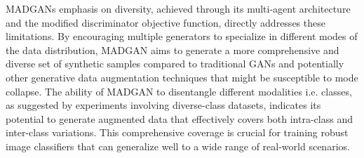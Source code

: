 MADGANs \cite{ghosh2018madgan} emphasis on diversity, achieved through its multi-agent architecture and the modified discriminator objective function, directly addresses these limitations. By encouraging multiple generators to specialize in different modes of the data distribution, MADGAN aims to generate a more comprehensive and diverse set of synthetic samples compared to traditional GANs and potentially other generative data augmentation techniques that might be susceptible to mode collapse. The ability of MADGAN to disentangle different modalities i.e. classes, as suggested by experiments involving diverse-class datasets, indicates its potential to generate augmented data that effectively covers both intra-class and inter-class variations. This comprehensive coverage is crucial for training robust image classifiers that can generalize well to a wide range of real-world scenarios.

\newpage
